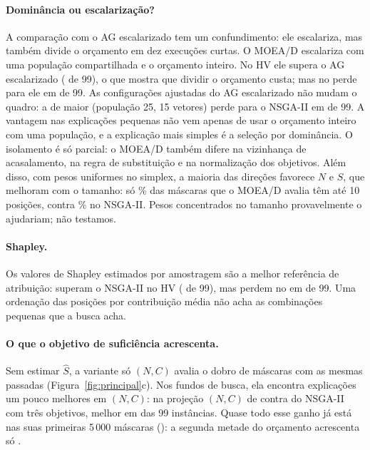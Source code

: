 \paragraph{Dominância ou escalarização?}
A comparação com o AG escalarizado tem um confundimento: ele escalariza, mas
também divide o orçamento em dez execuções curtas. O MOEA/D escalariza com uma
população compartilhada e o orçamento inteiro. No HV ele supera o AG
escalarizado ( de 99), o que mostra que
dividir o orçamento custa; mas no \HVp{} perde para ele em
 de 99. As configurações ajustadas do
AG escalarizado não mudam o quadro: a de maior \HVp{} (população 25, 15
vetores) perde para o NSGA-II em  de 99.
A vantagem nas explicações pequenas não vem apenas de usar o orçamento inteiro
com uma população, e a explicação mais simples é a seleção por dominância. O
isolamento é só parcial: o MOEA/D também difere na vizinhança de acasalamento,
na regra de substituição e na normalização dos objetivos. Além disso, com
pesos uniformes no simplex, a maioria das direções favorece $N$ e $S$, que
melhoram com o tamanho: só \% das máscaras que o MOEA/D
avalia têm até 10 posições, contra \% no NSGA-II. Pesos
concentrados no tamanho provavelmente o ajudariam; não testamos.

\paragraph{Shapley.}
Os valores de Shapley estimados por amostragem são a melhor referência de
atribuição: superam o NSGA-II no HV (
de 99), mas perdem no \HVp{} em  de 99. Uma
ordenação das posições por contribuição média não acha as combinações pequenas
que a busca acha.

\paragraph{O que o objetivo de suficiência acrescenta.}
\label{sec:valor-s}
Sem estimar $\hat S$, a variante só $(N,C)$ avalia o dobro de máscaras com as
mesmas passadas (Figura~\ref{fig:principal}c). Nos fundos de busca, ela encontra explicações um pouco melhores em $(N,C)$: \HVp{}
na projeção $(N,C)$ de  contra
 do NSGA-II com três objetivos, melhor em
 das 99 instâncias. Quase todo esse ganho já está
nas suas primeiras 5\,000 máscaras (): a
segunda metade do orçamento acrescenta só .

